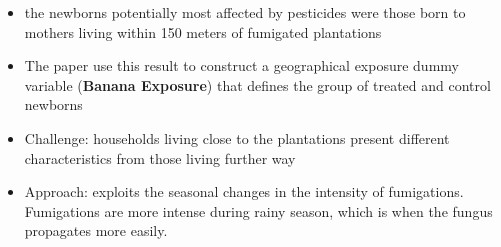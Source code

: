 \documentclass[hyperref={pdfpagelabels=false}]{beamer}
\begin{document}
        \begin{frame}{}
        
        \begin{itemize}
        \justifying
            \item the newborns potentially most affected by pesticides were those born to mothers living within 150 meters of fumigated plantations
            \vspace{2mm}
            \item The paper use this result to construct a geographical exposure dummy variable (\textcolor{myblue}{\textbf{Banana Exposure}}) that defines the group of treated and control newborns
            \vspace{2mm}
            \item \textcolor{bondiblue}{Challenge}: households living close to the plantations present different characteristics from those living further way 
           \vspace{2mm}
            \item \textcolor{bondiblue}{Approach}: exploits the seasonal changes in the intensity of fumigations. Fumigations are more intense during rainy season, which is when the fungus propagates more easily.
          
        \end{itemize}
            
        \end{frame}
\end{document}
